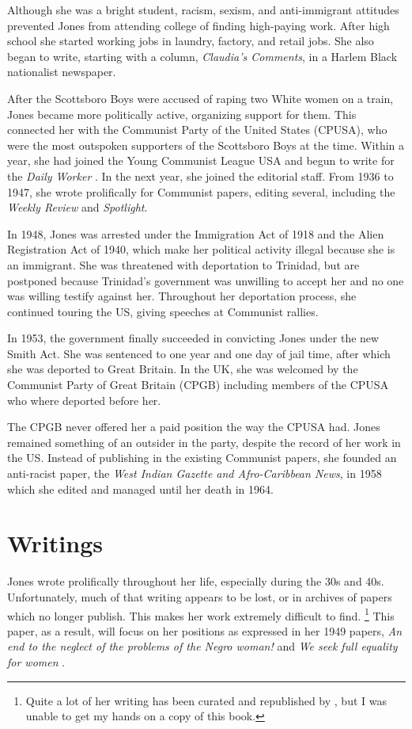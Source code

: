 \documentclass[man,12pt,natbib]{apa6}
\begin{document}
Although she was a bright student, racism, sexism, and anti-immigrant attitudes
prevented Jones from attending college of finding high-paying work. After high
school she started working jobs in laundry, factory, and retail jobs. She also 
began to write, starting with a column, \emph{Claudia's Comments}, in a Harlem
Black nationalist newspaper.

After the Scottsboro Boys were accused of raping two White women on a train, 
Jones became more politically active, organizing support for them. This
connected her with the Communist Party of the United States (CPUSA), who were
the most outspoken supporters of the Scottsboro Boys at the time. Within a 
year, she had joined the Young Communist League USA and begun to write for the
\emph{Daily Worker} \citep{Davis15}. In the next year, she joined the editorial
staff. From 1936 to 1947, she wrote prolifically for Communist papers, editing
several, including the \emph{Weekly Review} and \emph{Spotlight}.

In 1948, Jones was arrested under the Immigration Act of 1918 and the Alien
Registration Act of 1940, which make her political activity illegal because
she is an immigrant. She was threatened with deportation to Trinidad, but 
are postponed because Trinidad's government was unwilling to accept her and
no one was willing testify against her. Throughout her deportation process, she
continued touring the US, giving speeches at Communist rallies.

In 1953, the government finally succeeded in convicting Jones under the new
Smith Act. She was sentenced to one year and one day of jail time, after which
she was deported to Great Britain. In the UK, she was welcomed by the Communist
Party of Great Britain (CPGB) including members of the CPUSA who where deported
before her.

The CPGB never offered her a paid position the way the CPUSA had. Jones
remained something of an outsider in the party, despite the record of her work
in the US. Instead of publishing in the existing Communist papers, she founded
an anti-racist paper, the \emph{West Indian Gazette and Afro-Caribbean News},
in 1958 which she edited and managed until her death in 1964.

\section{Writings}

Jones wrote prolifically throughout her life, especially during the 30s and
40s.  Unfortunately, much of that writing appears to be lost, or in archives of
papers which no longer publish. This makes her work extremely difficult to
find.%
\footnote{Quite a lot of her writing has been curated and republished by
	\citet{Davies11}, but I was unable to get my hands on a copy of this book.}
This paper, as a result, will focus on her positions as expressed in her 1949
papers, \emph{An end to the neglect of the problems of the Negro woman!}
\citep{Jones49a} and \emph{We seek full equality for women} \citep{Jones49b}.
\end{document}

